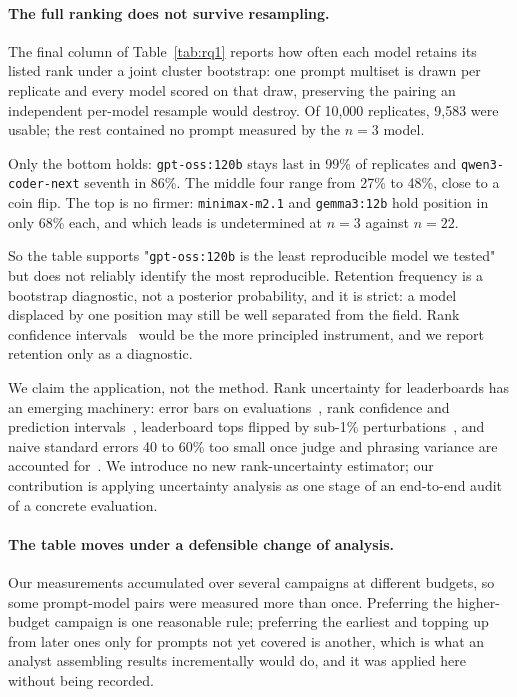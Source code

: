\documentclass{article}
\begin{document}
\paragraph{The full ranking does not survive resampling.}
The final column of Table~\ref{tab:rq1} reports how often each model retains its listed rank under a joint cluster bootstrap: one prompt multiset is drawn per replicate and every model scored on that draw, preserving the pairing an independent per-model resample would destroy. Of 10{,}000 replicates, 9{,}583 were usable; the rest contained no prompt measured by the $n=3$ model.

Only the bottom holds: \texttt{gpt-oss:120b} stays last in 99\% of replicates and \texttt{qwen3-coder-next} seventh in 86\%. The middle four range from 27\% to 48\%, close to a coin flip. The top is no firmer: \texttt{minimax-m2.1} and \texttt{gemma3:12b} hold position in only 68\% each, and which leads is undetermined at $n=3$ against $n=22$.

So the table supports "\texttt{gpt-oss:120b} is the least reproducible model we tested" but does not reliably identify the most reproducible. Retention frequency is a bootstrap diagnostic, not a posterior probability, and it is strict: a model displaced by one position may still be well separated from the field. Rank confidence intervals~\citep{neuhof2026rankintervals} would be the more principled instrument, and we report retention only as a diagnostic.

We claim the application, not the method. Rank uncertainty for leaderboards has an emerging machinery: error bars on evaluations~\citep{miller2024errorbars}, rank confidence and prediction intervals~\citep{neuhof2026rankinguncertainty,neuhof2026rankintervals}, leaderboard tops flipped by sub-1\% perturbations~\citep{oyarhoseini2026leaderboardstability}, and naive standard errors 40 to 60\% too small once judge and phrasing variance are accounted for~\citep{messing2026hiddenerror}. We introduce no new rank-uncertainty estimator; our contribution is applying uncertainty analysis as one stage of an end-to-end audit of a concrete evaluation.

\paragraph{The table moves under a defensible change of analysis.}
Our measurements accumulated over several campaigns at different budgets, so some prompt-model pairs were measured more than once. Preferring the higher-budget campaign is one reasonable rule; preferring the earliest and topping up from later ones only for prompts not yet covered is another, which is what an analyst assembling results incrementally would do, and it was applied here without being recorded.
\end{document}
